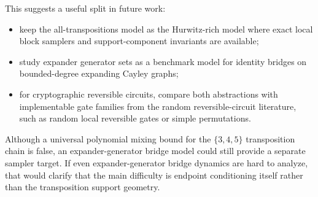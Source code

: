This suggests a useful split in future work:
\begin{itemize}
\item keep the all-transpositions model as the Hurwitz-rich model where exact
  local block samplers and support-component invariants are available;
\item study expander generator sets as a benchmark model for identity
  bridges on bounded-degree expanding Cayley graphs;
\item for cryptographic reversible circuits, compare both abstractions with
  implementable gate families from the random reversible-circuit literature,
  such as random local reversible gates or simple permutations.
\end{itemize}

Although a universal polynomial mixing bound for the $\{3,4,5\}$
transposition chain is false, an expander-generator bridge model could
still provide a separate sampler target.  If even expander-generator bridge
dynamics are hard to analyze, that would clarify that the main difficulty is
endpoint conditioning itself rather than the transposition support geometry.
